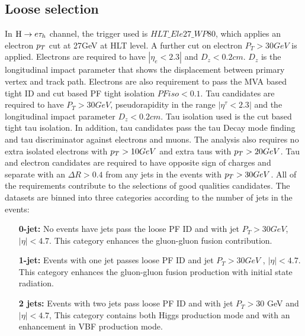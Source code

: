 \subsection{Loose selection}
In $ \mathrm{H} \to e \tau_{h}$ channel, the trigger used is $HLT\_Ele27\_WP80$, which applies an electron $p_{T}$ cut at 27GeV at HLT level. A further cut on electron $P_{T}>30GeV$ is applied. Electrons are required to have $|\eta_{e}<2.3|$ and $D_{z}<0.2 cm$. $D_{z}$ is the longitudinal impact parameter that shows the displacement between primary vertex and track path. Electrons are also requirement to pass the MVA based tight ID and cut based PF tight isolation  $PFiso<0.1$. Tau candidates are required to have $P_{T}>30GeV$, pseudorapidity in the range $|\eta^{\tau}<2.3|$ and the longitudinal impact parameter $D_{z}<0.2 cm$. Tau isolation used is the cut based tight tau isolation. In addition, tau candidates pass the tau Decay mode finding and tau discriminator against electrons and muons. The analysis also requires no extra isolated electrons with $p_{T}>10GeV$ and extra taus with $p_{T}>20GeV$. Tau and electron candidates are required to have opposite sign of charges and separate with an $\Delta R>0.4$ from any jets in the events with $p_{T}>30GeV$. All of the requirements contribute to the selections of good qualities candidates. The datasets are binned into three categories according to the number of jets in the events:
\begin{enumerate}
\item[{\bf 0-jet:}] No events have jets pass the loose PF ID and  with jet $P_T>30GeV$, $|\eta|<4.7$. This category enhances the gluon-gluon fusion contribution.
\item[{\bf 1-jet:}] Events with one jet passes loose PF ID and jet $P_T>30GeV$ , $|\eta|<4.7$. This category enhances the gluon-gluon fusion production with initial state radiation.
\item [{\bf 2 jets:}] Events with two jets pass loose PF ID and with jet $P_T>30$ GeV and $|\eta|<4.7$, This category contains both Higgs production mode and with an enhancement in VBF production mode. \end{enumerate}

